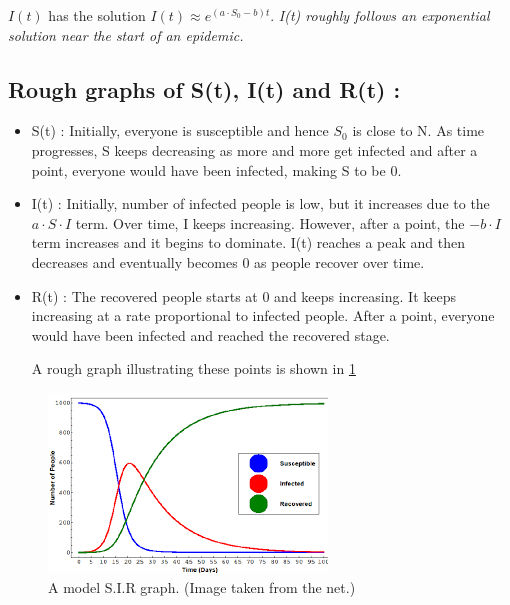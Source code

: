 \documentclass{article}
\begin{document}
$I(t)$ has the solution $ I(t) \approx e^{\left(a\cdot S_0 - b\right)t} $. \emph{I(t) roughly follows an exponential solution near the start of an epidemic.}

\subsection*{Rough graphs of S(t), I(t) and R(t) :}
\begin{itemize}
    \item S(t) : Initially, everyone is susceptible and hence $S_0$ is close to N. As time progresses, S keeps decreasing as more and more get infected and after a point, everyone would have been infected, making S to be 0.
    \item I(t) : Initially, number of infected people is low, but it increases due to the $a\cdot S \cdot I$ term. Over time, I keeps increasing. However, after a point, the $-b \cdot I$ term increases and it begins to dominate. I(t) reaches a peak and then decreases and eventually becomes 0 as people recover over time.
    \item R(t) : The recovered people starts at 0 and keeps increasing. It keeps increasing at a rate proportional to infected people. After a point, everyone would have been infected and reached the recovered stage.
    
    A rough graph illustrating these points is shown in \ref{fig:sir_graph}
\end{itemize}    
\begin{figure}
    \centering
    \includegraphics[scale = 1.00]{sir}
    \caption{A model S.I.R graph. (Image taken from the net.)}
    \label{fig:sir_graph}
\end{figure}
\end{document}
